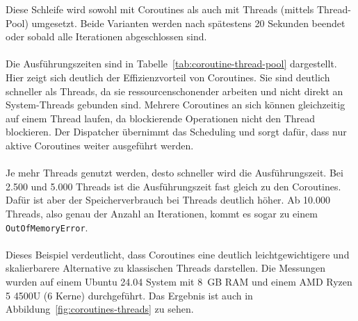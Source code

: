 \documentclass[11pt]{article}
\begin{document}
    Diese Schleife wird sowohl mit Coroutines als auch mit Threads (mittels Thread-Pool) umgesetzt.
    Beide Varianten werden nach spätestens 20 Sekunden beendet oder sobald alle Iterationen abgeschlossen sind.\\
    \\
    Die Ausführungszeiten sind in Tabelle~\ref{tab:coroutine-thread-pool} dargestellt.
    Hier zeigt sich deutlich der Effizienzvorteil von Coroutines.
    Sie sind deutlich schneller als Threads, da sie ressourcenschonender arbeiten und nicht direkt an System-Threads gebunden sind.
    Mehrere Coroutines an sich können gleichzeitig auf einem Thread laufen, da blockierende Operationen nicht den Thread blockieren.
    Der Dispatcher übernimmt das Scheduling und sorgt dafür, dass nur aktive Coroutines weiter ausgeführt werden.\\
    \\
    Je mehr Threads genutzt werden, desto schneller wird die Ausführungszeit.
    Bei 2.500 und 5.000 Threads ist die Ausführungszeit fast gleich zu den Coroutines.
    Dafür ist aber der Speicherverbrauch bei Threads deutlich höher.
    Ab 10.000 Threads, also genau der Anzahl an Iterationen, kommt es sogar zu einem \texttt{OutOfMemoryError}.\\
    \\
    Dieses Beispiel verdeutlicht, dass Coroutines eine deutlich leichtgewichtigere und skalierbarere Alternative zu klassischen Threads darstellen.
    Die Messungen wurden auf einem Ubuntu 24.04 System mit 8~GB RAM und einem AMD Ryzen 5 4500U (6 Kerne) durchgeführt.
    Das Ergebnis ist auch in Abbildung~\ref{fig:coroutines-threads} zu sehen.\\
    \\
\end{document}
